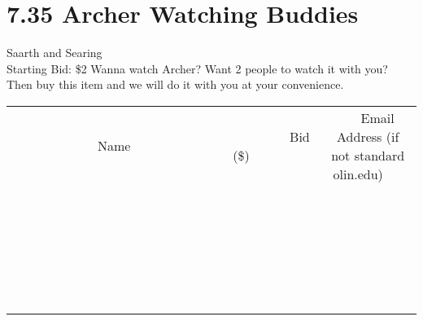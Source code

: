 \documentclass[11pt]{article}
\begin{document}
\section*{7.35 Archer Watching Buddies}
Saarth and Searing
\\
Starting Bid: \$2
\newline
Wanna watch Archer? Want 2 people to watch it with you? Then buy this item and we will do it with you at your convenience.
\\[6ex]
\begin{tabular}{c c c}
~~~~~~~~~~~~~Name~~~~~~~~~~~~~ & ~~~~~~~~~Bid (\$)~~~~~~~~~  & ~~~Email Address (if not standard olin.edu)~~~\\
 & & \\
\hline
 & & \\
\hline
 & & \\
\hline
 & & \\
\hline
 & & \\
\hline
 & & \\
\hline
 & & \\
\hline
 & & \\
\hline
 & & \\
\hline
 & & \\
\hline
 & & \\
\hline
 & & \\
\hline
 & & \\
\hline
 & & \\
\hline
 & & \\
\hline
 & & \\
\hline
 & & \\
\hline
 & & \\
\hline
 & & \\
\hline
 & & \\
\hline
 & & \\
\hline
 & & \\
\hline
 & & \\
\hline
 & & \\
\hline
 & & \\
\hline
 & & \\
\hline
\end{tabular}
\newpage
\end{document}

